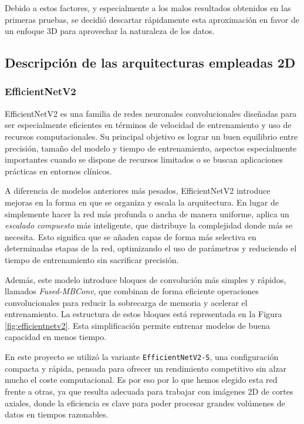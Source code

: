 Debido a estos factores, y especialmente a los malos resultados obtenidos en las primeras pruebas, se decidió descartar rápidamente esta aproximación en favor de un enfoque 3D para aprovechar la naturaleza de los datos.


\subsection{Descripción de las arquitecturas empleadas 2D}

\subsubsection{EfficientNetV2}
EfficientNetV2  \parencite{tan2021efficientnetv2} es una familia de redes neuronales convolucionales diseñadas para ser especialmente eficientes en términos de velocidad de entrenamiento y uso de recursos computacionales. Su principal objetivo es lograr un buen equilibrio entre precisión, tamaño del modelo y tiempo de entrenamiento, aspectos especialmente importantes cuando se dispone de recursos limitados o se buscan aplicaciones prácticas en entornos clínicos.

A diferencia de modelos anteriores más pesados, EfficientNetV2 introduce mejoras en la forma en que se organiza y escala la arquitectura. En lugar de simplemente hacer la red más profunda o ancha de manera uniforme, aplica un \textit{escalado compuesto} más inteligente, que distribuye la complejidad donde más se necesita. Esto significa que se añaden capas de forma más selectiva en determinadas etapas de la red, optimizando el uso de parámetros y reduciendo el tiempo de entrenamiento sin sacrificar precisión.

Además, este modelo introduce bloques de convolución más simples y rápidos, llamados \textit{Fused-MBConv}, que combinan de forma eficiente operaciones convolucionales para reducir la sobrecarga de memoria y acelerar el entrenamiento. La estructura de estos bloques está representada en la Figura \ref{fig:efficientnetv2}. Esta simplificación permite entrenar modelos de buena capacidad en menos tiempo.

En este proyecto se utilizó la variante \texttt{EfficientNetV2-S}, una configuración compacta y rápida, pensada para ofrecer un rendimiento competitivo sin alzar mucho el coste computacional. Es por eso por lo que hemos elegido esta red frente a otras, ya que resulta adecuada para trabajar con imágenes 2D de cortes axiales, donde la eficiencia es clave para poder procesar grandes volúmenes de datos en tiempos razonables.

